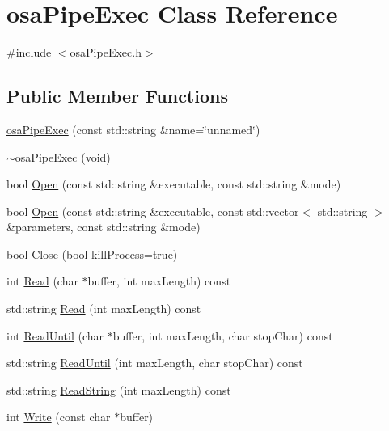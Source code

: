 \hypertarget{classosa_pipe_exec}{}\section{osa\+Pipe\+Exec Class Reference}
\label{classosa_pipe_exec}


{\ttfamily \#include $<$osa\+Pipe\+Exec.\+h$>$}

\subsection*{Public Member Functions}
\begin{DoxyCompactItemize}
\item 
\hyperlink{classosa_pipe_exec_a782d03c0baeadfc1f7cac158b1a08514}{osa\+Pipe\+Exec} (const std\+::string \&name=\char`\"{}unnamed\char`\"{})
\item 
\hyperlink{classosa_pipe_exec_ae47595e886ef8976a10c19498e7e0494}{$\sim$osa\+Pipe\+Exec} (void)
\item 
bool \hyperlink{classosa_pipe_exec_a1e8c63d5b5e88d9e7e55323a3aed86ce}{Open} (const std\+::string \&executable, const std\+::string \&mode)
\item 
bool \hyperlink{classosa_pipe_exec_a944441db45e47c0365d29bdd3ebf04e6}{Open} (const std\+::string \&executable, const std\+::vector$<$ std\+::string $>$ \&parameters, const std\+::string \&mode)
\item 
bool \hyperlink{classosa_pipe_exec_afa164cafaeb53cc0add1fe28b6a12149}{Close} (bool kill\+Process=true)
\item 
int \hyperlink{classosa_pipe_exec_a6cb69a8b0b8dc222f64302340b3ee397}{Read} (char $\ast$buffer, int max\+Length) const 
\item 
std\+::string \hyperlink{classosa_pipe_exec_a6ff1f190850c432025a4134e1caf000d}{Read} (int max\+Length) const 
\item 
int \hyperlink{classosa_pipe_exec_abc2fc682f8674a1ee01588b8b0fe9034}{Read\+Until} (char $\ast$buffer, int max\+Length, char stop\+Char) const 
\item 
std\+::string \hyperlink{classosa_pipe_exec_a4d0fa04f0fe18b500bdc4aac3348d4b6}{Read\+Until} (int max\+Length, char stop\+Char) const 
\item 
std\+::string \hyperlink{classosa_pipe_exec_ac56211fae748911bc7202c4e0cea9f80}{Read\+String} (int max\+Length) const 
\item 
int \hyperlink{classosa_pipe_exec_ad3d51e076b28f55590a7a0ae3b158d03}{Write} (const char $\ast$buffer)

\end{DoxyCompactItemize}

